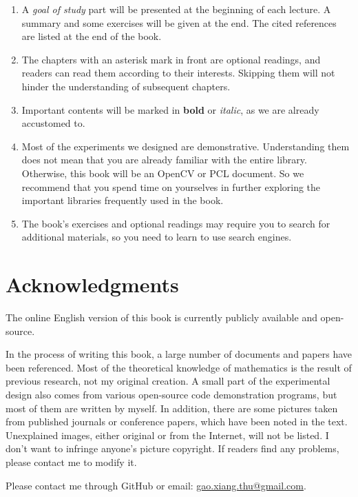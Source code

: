 \begin{enumerate}
	\item A \textit{goal of study} part will be presented at the beginning of each lecture. A summary and some exercises will be given at the end. The cited references are listed at the end of the book.

	\item The chapters with an asterisk mark in front are optional readings, and readers can read them according to their interests. Skipping them will not hinder the understanding of subsequent chapters.
	
	\item Important contents will be marked in \textbf{bold} or \emph{italic}, as we are already accustomed to.

	\item Most of the experiments we designed are demonstrative. Understanding them does not mean that you are already familiar with the entire library. Otherwise, this book will be an OpenCV or PCL document. So we recommend that you spend time on yourselves in further exploring the important libraries frequently used in the book.

	\item The book's exercises and optional readings may require you to search for additional materials, so you need to learn to use search engines.
\end{enumerate}

\section{Acknowledgments}
The online English version of this book is currently publicly available and open-source. %

In the process of writing this book, a large number of documents and papers have been referenced. Most of the theoretical knowledge of mathematics is the result of previous research, not my original creation. A small part of the experimental design also comes from various open-source code demonstration programs, but most of them are written by myself. In addition, there are some pictures taken from published journals or conference papers, which have been noted in the text. Unexplained images, either original or from the Internet, will not be listed. I don’t want to infringe anyone’s picture copyright. If readers find any problems, please contact me to modify it. 

Please contact me through GitHub or email: \href{mailto:gao.xiang.thu@gmail.com}{gao.xiang.thu@gmail.com}.

